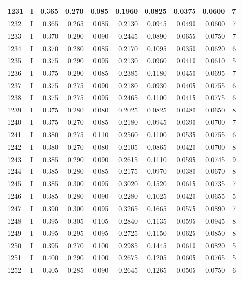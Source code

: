 \documentclass[9pt,twocolumn,twoside,]{pnas-new}
\begin{document}
\begin{tabular}{l|l|r|r|r|r|r|r|r|r}
\hline
1231 & I & 0.365 & 0.270 & 0.085 & 0.1960 & 0.0825 & 0.0375 & 0.0600 & 7\\
\hline
1232 & I & 0.365 & 0.265 & 0.085 & 0.2130 & 0.0945 & 0.0490 & 0.0600 & 7\\
\hline
1233 & I & 0.370 & 0.290 & 0.090 & 0.2445 & 0.0890 & 0.0655 & 0.0750 & 7\\
\hline
1234 & I & 0.370 & 0.280 & 0.085 & 0.2170 & 0.1095 & 0.0350 & 0.0620 & 6\\
\hline
1235 & I & 0.375 & 0.290 & 0.095 & 0.2130 & 0.0960 & 0.0410 & 0.0610 & 5\\
\hline
1236 & I & 0.375 & 0.290 & 0.085 & 0.2385 & 0.1180 & 0.0450 & 0.0695 & 7\\
\hline
1237 & I & 0.375 & 0.275 & 0.090 & 0.2180 & 0.0930 & 0.0405 & 0.0755 & 6\\
\hline
1238 & I & 0.375 & 0.275 & 0.095 & 0.2465 & 0.1100 & 0.0415 & 0.0775 & 6\\
\hline
1239 & I & 0.375 & 0.280 & 0.080 & 0.2025 & 0.0825 & 0.0480 & 0.0650 & 8\\
\hline
1240 & I & 0.375 & 0.270 & 0.085 & 0.2180 & 0.0945 & 0.0390 & 0.0700 & 7\\
\hline
1241 & I & 0.380 & 0.275 & 0.110 & 0.2560 & 0.1100 & 0.0535 & 0.0755 & 6\\
\hline
1242 & I & 0.380 & 0.270 & 0.080 & 0.2105 & 0.0865 & 0.0420 & 0.0700 & 8\\
\hline
1243 & I & 0.385 & 0.290 & 0.090 & 0.2615 & 0.1110 & 0.0595 & 0.0745 & 9\\
\hline
1244 & I & 0.385 & 0.280 & 0.085 & 0.2175 & 0.0970 & 0.0380 & 0.0670 & 8\\
\hline
1245 & I & 0.385 & 0.300 & 0.095 & 0.3020 & 0.1520 & 0.0615 & 0.0735 & 7\\
\hline
1246 & I & 0.385 & 0.280 & 0.090 & 0.2280 & 0.1025 & 0.0420 & 0.0655 & 5\\
\hline
1247 & I & 0.390 & 0.300 & 0.095 & 0.3265 & 0.1665 & 0.0575 & 0.0890 & 7\\
\hline
1248 & I & 0.395 & 0.305 & 0.105 & 0.2840 & 0.1135 & 0.0595 & 0.0945 & 8\\
\hline
1249 & I & 0.395 & 0.295 & 0.095 & 0.2725 & 0.1150 & 0.0625 & 0.0850 & 8\\
\hline
1250 & I & 0.395 & 0.270 & 0.100 & 0.2985 & 0.1445 & 0.0610 & 0.0820 & 5\\
\hline
1251 & I & 0.400 & 0.290 & 0.100 & 0.2675 & 0.1205 & 0.0605 & 0.0765 & 5\\
\hline
1252 & I & 0.405 & 0.285 & 0.090 & 0.2645 & 0.1265 & 0.0505 & 0.0750 & 6\\

\end{tabular}
\end{document}
